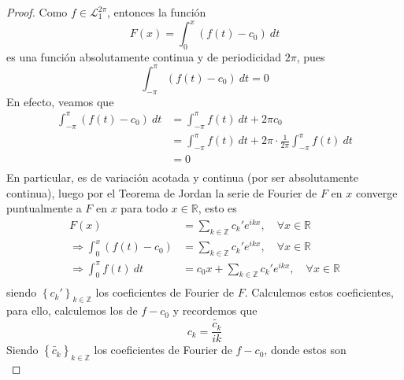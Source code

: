 \documentclass[12pt]{report}
\theoremstyle{largebreak}
\begin{document}
    \begin{proof}
        Como $f\in\mathcal{L}_1^{2\pi}$, entonces la función
        \begin{equation*}
            F(x)=\int_{0}^{x}\left(f(t)-c_0 \right)\:dt
        \end{equation*}
        es una función absolutamente continua y de periodicidad $2\pi$, pues
        \begin{equation*}
            \int_{-\pi}^{\pi}(f(t)-c_0)\:dt=0
        \end{equation*}
        En efecto, veamos que
        \begin{equation*}
            \begin{split}
                \int_{-\pi}^{\pi}(f(t)-c_0)\:dt&=\int_{-\pi}^{\pi}f(t)\:dt+2\pi c_0\\
                &=\int_{-\pi}^{\pi}f(t)\:dt+2\pi\cdot\frac{1}{2\pi}\int_{-\pi}^{\pi}f(t)\:dt\\
                &=0\\
            \end{split}
        \end{equation*}
        En particular, es de variación acotada y continua (por ser absolutamente continua), luego por el Teorema de Jordan la serie de Fourier de $F$ en $x$ converge puntualmente a $F$ en $x$ para todo $x\in\mathbb{R}$, esto es
        \begin{equation*}
            \begin{split}
                F(x)&=\sum_{ k\in\mathbb{Z}}c_k'e^{ ikx},\quad\forall x\in\mathbb{R}\\
                \Rightarrow \int_{0}^{x}(f(t)-c_0)&=\sum_{ k\in\mathbb{Z}}c_k'e^{ ikx},\quad\forall x\in\mathbb{R}\\
                \Rightarrow \int_{0}^{\pi}f(t)\:dt&=c_0x+\sum_{ k\in\mathbb{Z}}c_k'e^{ ikx},\quad\forall x\in\mathbb{R}\\
            \end{split}
        \end{equation*}
        siendo $\left\{c_k'\right\}_{ k\in\mathbb{Z}}$ los coeficientes de Fourier de $F$. Calculemos estos coeficientes, para ello, calculemos los de $f-c_0$ y recordemos que
        \begin{equation*}
            c_k=\frac{\tilde{c_k}}{ik}
        \end{equation*}
        Siendo $\left\{\tilde{c_k}\right\}_{ k\in\mathbb{Z}}$ los coeficientes de Fourier de $f-c_0$, donde estos son
        \begin{equation*}

\end{equation*}
\end{proof}
\end{document}
